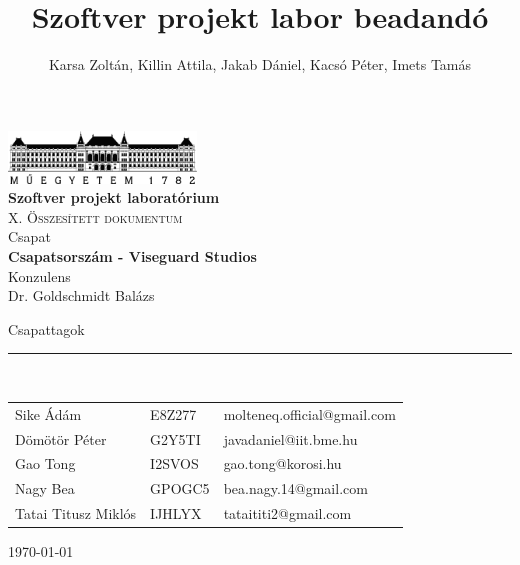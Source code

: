\documentclass[12pt, a4paper]{book}
\title{Szoftver projekt labor beadandó}
\author{Karsa Zoltán, Killin Attila, Jakab Dániel, Kacsó Péter, Imets Tamás}
\begin{document}
\begin{titlepage} 
	\begin{center}
		\includegraphics[width=5cm]{docs/img/BMElogo}\\ 
		\vspace{1cm}
		\LARGE{\bfseries{Szoftver projekt laboratórium}}\\
		\vspace{0.5cm}
		\Large\textsc{X. Összesített dokumentum}\\
		\vspace{1cm}
		\small{Csapat}\\
		\Large{\bfseries{Csapatsorszám - Viseguard Studios}}\\
		\vspace{1cm}
		\small{Konzulens}\\
		\Large{Dr. Goldschmidt Balázs}
	\end{center}
	\begin{flushleft}
		\vspace*{6cm}
		Csapattagok\\
		\vspace{-0.3cm}
		\rule{14cm}{0.5pt}\\
		\vspace{0.2cm}
		\begin{tabular}{l l l} %
			Sike Ádám & E8Z277 & molteneq.official@gmail.com \\
			Dömötör Péter & G2Y5TI & javadaniel@iit.bme.hu \\
			Gao Tong & I2SVOS & gao.tong@korosi.hu \\
			Nagy Bea  & GPOGC5 & bea.nagy.14@gmail.com \\
			Tatai Titusz Miklós & IJHLYX & tataititi2@gmail.com \\
		\end{tabular}
	\end{flushleft}
	\begin{flushright}
		\vspace*{2cm}
		\today   %
	\end{flushright}
\end{titlepage}

\sloppy

\end{document}
